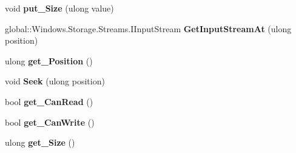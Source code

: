 \begin{DoxyCompactItemize}
\item 
\mbox{\label{interface_windows_1_1_storage_1_1_streams_1_1_i_random_access_stream_af1e96ffb576c8a390fa379fcb6923c44}} 
void {\bfseries put\+\_\+\+Size} (ulong value)
\item 
\mbox{\label{interface_windows_1_1_storage_1_1_streams_1_1_i_random_access_stream_a937b4579f3c69b8f3e102e47786cd661}} 
global\+::\+Windows.\+Storage.\+Streams.\+I\+Input\+Stream {\bfseries Get\+Input\+Stream\+At} (ulong position)
\item 
\mbox{\label{interface_windows_1_1_storage_1_1_streams_1_1_i_random_access_stream_aac0ed113bee77668c3882dd6d533c50e}} 
ulong {\bfseries get\+\_\+\+Position} ()
\item 
\mbox{\label{interface_windows_1_1_storage_1_1_streams_1_1_i_random_access_stream_a85c3af465abf7d76b4e63d17a6822fb0}} 
void {\bfseries Seek} (ulong position)
\item 
\mbox{\label{interface_windows_1_1_storage_1_1_streams_1_1_i_random_access_stream_ae4d5064fd211749208909f7f6fe63102}} 
bool {\bfseries get\+\_\+\+Can\+Read} ()
\item 
\mbox{\label{interface_windows_1_1_storage_1_1_streams_1_1_i_random_access_stream_a4794da7c24985d3c5fd5660548461faf}} 
bool {\bfseries get\+\_\+\+Can\+Write} ()
\item 
\mbox{\label{interface_windows_1_1_storage_1_1_streams_1_1_i_random_access_stream_a6a413a2448bfb33490c1228972b1ac8c}} 
ulong {\bfseries get\+\_\+\+Size} ()
\item 
\mbox{\label{interface_windows_1_1_storage_1_1_streams_1_1_i_random_access_stream_af1e96ffb576c8a390fa379fcb6923c44}} 

\end{DoxyCompactItemize}
